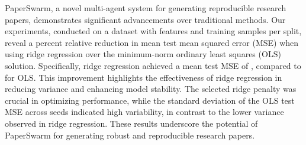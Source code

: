 PaperSwarm, a novel multi-agent system for generating reproducible research papers, demonstrates significant advancements over traditional methods. Our experiments, conducted on a dataset with  features and  training samples per split, reveal a  percent relative reduction in mean test mean squared error (MSE) when using ridge regression over the minimum-norm ordinary least squares (OLS) solution. Specifically, ridge regression achieved a mean test MSE of , compared to  for OLS. This improvement highlights the effectiveness of ridge regression in reducing variance and enhancing model stability. The selected ridge penalty  was crucial in optimizing performance, while the standard deviation of the OLS test MSE across seeds  indicated high variability, in contrast to the lower variance observed in ridge regression. These results underscore the potential of PaperSwarm for generating robust and reproducible research papers.

